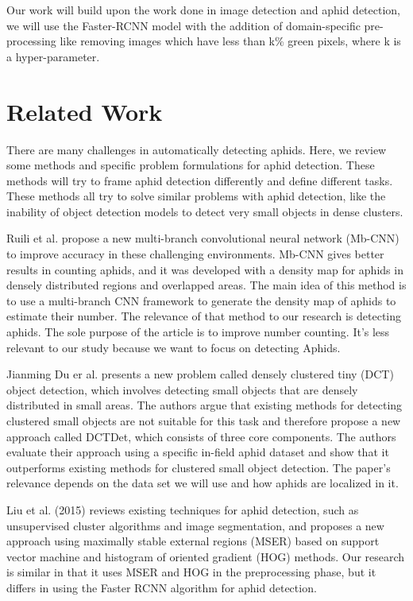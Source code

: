 \documentclass{article}
\begin{document}
Our work will build upon the work done in image detection and aphid detection, 
we will use the Faster-RCNN model with the addition of domain-specific pre-processing 
like removing images which have less than k\% green pixels, where k is a hyper-parameter.

\newpage
\section*{Related Work}
There are many challenges in automatically detecting aphids. 
Here, we review some methods and specific problem formulations for aphid detection. 
These methods will try to frame aphid detection differently and define different tasks. 
These methods all try to solve similar problems with aphid detection, 
like the inability of object detection models to detect very small objects in dense clusters.


Ruili et al. propose a new multi-branch convolutional neural network (Mb-CNN) 
to improve accuracy in these challenging environments. Mb-CNN gives better results in counting aphids, 
and it was developed with a density map for aphids in densely distributed regions and overlapped areas. 
The main idea of this method is to use a multi-branch CNN framework to generate the density map of 
aphids to estimate their number. The relevance of that method to our research is detecting aphids. 
The sole purpose of the article is to improve number counting. 
It's less relevant to our study because we want to focus on detecting Aphids.


Jianming Du er al. \cite{DenseTinyPest} presents a new problem called densely clustered tiny (DCT) object detection, 
which involves detecting small objects that are densely distributed in small areas. 
The authors argue that existing methods for detecting clustered small objects are not suitable 
for this task and therefore propose a new approach called DCTDet, 
which consists of three core components. The authors evaluate their approach using a specific 
in-field aphid dataset and show that it outperforms existing methods for clustered small 
object detection. The paper's relevance depends on the data set we will use and how aphids are 
localized in it.


Liu et al. (2015) \cite{DetectionInWeatFields} reviews existing techniques for aphid detection, 
such as unsupervised cluster algorithms and image segmentation, 
and proposes a new approach using maximally stable external regions (MSER) based on support 
vector machine and histogram of oriented gradient (HOG) methods. 
Our research is similar in that it uses MSER and HOG in the preprocessing phase, 
but it differs in using the Faster RCNN algorithm for aphid detection.
\end{document}
